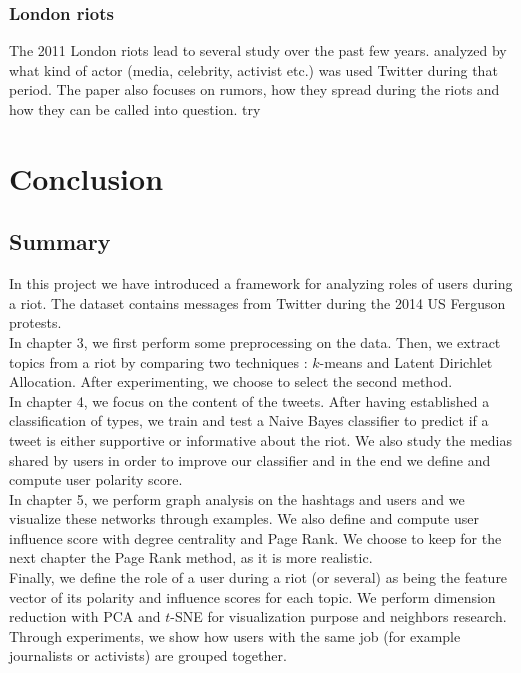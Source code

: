 \documentclass[a4paper,twoside,12pt,openright]{report}
\begin{document}
\subsection{London riots}

The 2011 London riots lead to several study over the past few years. 
\cite{procter2013reading} analyzed by what kind of actor (media, celebrity, activist etc.) was used Twitter during that period. The paper also focuses on rumors, how they spread during the riots and how they can be called into question.
\cite{tonkin2012twitter} try 

\newpage

\chapter{Conclusion}
\section{Summary}
In this project we have introduced a framework for analyzing roles of users during a riot. The dataset contains messages from Twitter during the 2014 US Ferguson protests.\\[2pt]

In chapter 3, we first perform some preprocessing on the data. Then, we extract topics from a riot by comparing two techniques : $k$-means and Latent Dirichlet Allocation. After experimenting, we choose to select the second method.\\[2pt]

In chapter 4, we focus on the content of the tweets. After having established a classification of types, we train and test a Naive Bayes classifier to predict if a tweet is either supportive or informative about the riot. We also study the medias shared by users in order to improve our classifier and in the end we define and compute user polarity score.\\[2pt]

In chapter 5, we perform graph analysis on the hashtags and users and we visualize these networks through examples. We also define and compute user influence score with degree centrality and Page Rank. We choose to keep for the next chapter the Page Rank method, as it is more realistic. \\[2pt]

Finally, we define the role of a user during a riot (or several) as being the feature vector of its polarity and influence scores for each topic. We perform dimension reduction with PCA and $t$-SNE for visualization purpose and neighbors research. Through experiments, we show how users with the same job (for example journalists or activists) are grouped together.
\end{document}
